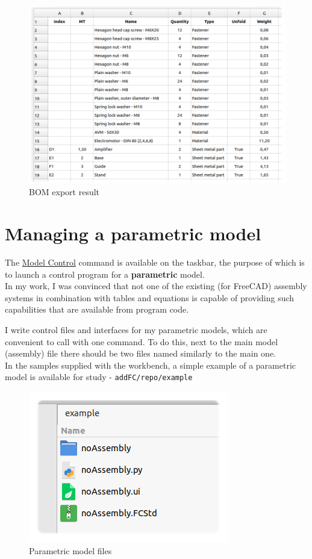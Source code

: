 \documentclass[a4paper,12pt]{article}
\begin{document}
\begin{figure}[htp]
\centering
\includegraphics[width=1.0\textwidth]{img/specification_result.png}
\caption{BOM export result}
\label{sec:specification_result}
\end{figure}

\pagebreak



\section{Managing a parametric model}
The \hyperref[sec:3]{Model Control} command is available on the taskbar, the purpose of which is to launch a control program for a \textbf{parametric} model.\\

In my work, I was convinced that not one of the existing (for FreeCAD) assembly systems in combination with tables and equations is capable of providing such capabilities that are available from program code.

I write control files and interfaces for my parametric models, which are convenient to call with one command. To do this, next to the main model (assembly) file there should be two files named similarly to the main one.\\

In the samples supplied with the workbench, a simple example of a parametric model is available for study - \verb|addFC/repo/example|

\begin{figure}[htp]
\centering
\includegraphics[scale=0.8]{img/example.png}
\caption{Parametric model files}
\label{sec:example}
\end{figure}
\end{document}
